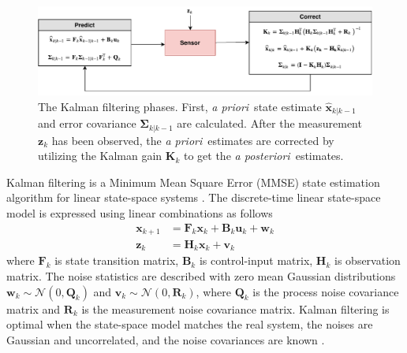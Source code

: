 \documentclass[english, 12pt, a4paper, elec, utf8, a-1b, online]{aaltothesis}
\renewcommand{\vec}[1]{\mathbf{#1}}
\newcommand{\xprior}{\hat{\vec{x}}_{k|k-1}}
\newcommand{\priorecov}{\boldsymbol{\Sigma}_{k|k-1}}
\newcommand{\x}{\vec{x}_k}
\newcommand{\xnext}{\vec{x}_{k+1}}
\newcommand{\z}{\vec{z}_k}
\newcommand{\stmodel}{\vec{F}_k}
\newcommand{\cimodel}{\vec{B}_k}
\newcommand{\cinput}{\vec{u}_k}
\newcommand{\pnoise}{\vec{w}_k}
\newcommand{\omodel}{\vec{H}_k}
\newcommand{\onoise}{\vec{v}_k}
\newcommand{\ocov}{\vec{R}_k}
\newcommand{\pcov}{\vec{Q}_k}
\newcommand{\gain}{\vec{K}_k}
\newcommand{\normal}[2]{\mathcal{N}\left(#1, #2 \right)}
\def\prior{\textit{a priori}\ }
\def\post{\textit{a posteriori}\ }
\begin{document}
\begin{figure}[b]
    \centering
    \includegraphics[width=\textwidth]{figures/KF.pdf}
    \caption{The Kalman filtering phases.
    First, \prior state estimate $\xprior$ and error covariance $\priorecov$ are calculated.
    After the measurement $\z$ has been observed, the \prior estimates are corrected by utilizing the Kalman gain $\gain$ to get the \post estimates.
    }
    \label{fig:KF}
\end{figure}

Kalman filtering is a Minimum Mean Square Error (MMSE) state estimation algorithm for linear state-space systems \cite{Zarchan2000}.
The discrete-time linear state-space model is expressed using linear combinations as follows \cite{Zarchan2000}
\begin{subequations}
\begin{align}
    \xnext &= \stmodel \x + \cimodel \cinput + \pnoise \label{eq:lsp_state} \\
    \z &= \omodel \x + \onoise \label{eq:lsp_obs}
\end{align}
\end{subequations}
where $\stmodel$ is state transition matrix, $\cimodel$ is control-input matrix, $ \omodel $ is observation matrix. 
The noise statistics are described with zero mean Gaussian distributions $\pnoise \sim \normal{0}{\pcov}$ and $\onoise \sim \normal{0}{\ocov}$, where $\pcov$ is the process noise covariance matrix and $\ocov$ is the measurement noise covariance matrix.
Kalman filtering is optimal when the state-space model matches the real system, the noises are Gaussian and uncorrelated, and the noise covariances are known \cite{Zarchan2000}.
\end{document}
